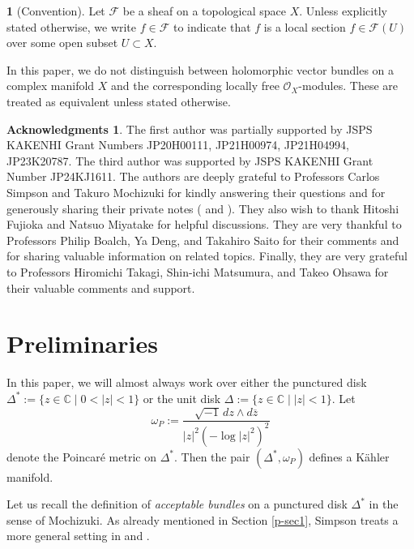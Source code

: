 \documentclass[12pt,twoside]{amsart}
\theoremstyle{definition}
\newtheorem*{ack}{Acknowledgments}
\newtheorem{say}[thm]{}
\begin{document}
\begin{say}[Convention]\label{p-say1.15}
Let $\mathcal{F}$ be a sheaf on a topological space $X$.  
Unless explicitly stated otherwise, we write  
$f \in \mathcal{F}$ to indicate that $f$ is a local section  
$f \in \mathcal{F}(U)$ over some open subset $U \subset X$.  

In this paper, we do not distinguish between holomorphic vector bundles  
on a complex manifold $X$ and the corresponding locally free  
$\mathcal{O}_X$-modules. These are treated as equivalent  
unless stated otherwise.
\end{say}

\begin{ack}\label{p-ack}
The first author was partially 
supported by JSPS KAKENHI Grant Numbers 
JP20H00111, JP21H00974, JP21H04994, JP23K20787. 
The third author was supported by 
JSPS KAKENHI Grant Number JP24KJ1611. 
The authors are deeply grateful 
to Professors Carlos Simpson and 
Takuro Mochizuki for kindly 
answering their questions and for generously 
sharing their private notes (\cite{simpson3} and \cite{mochizuki7}). 
They also wish to thank Hitoshi Fujioka 
and Natsuo Miyatake for helpful discussions. 
They are very thankful to Professors Philip Boalch, Ya Deng, and 
Takahiro Saito for their comments and for sharing valuable information 
on related topics.  
Finally, they are very grateful to Professors 
Hiromichi Takagi, Shin-ichi Matsumura, and 
Takeo Ohsawa for their valuable comments and support.
\end{ack}

\section{Preliminaries}\label{p-sec2}

In this paper, we will almost always 
work over either the punctured disk 
$\Delta^* := \{ z \in \mathbb{C} \mid 0 < |z| < 1 \}$ 
or the unit disk $\Delta := \{ z \in \mathbb{C} \mid |z| < 1 \}$.
Let 
\[
\omega_P := \frac{\sqrt{-1}\,dz \wedge d\overline{z}}{|z|^2 (-\log|z|^2)^2}
\] 
denote the Poincar\'e metric on $\Delta^*$.
Then the pair $(\Delta^*, \omega_P)$ defines a K\"ahler manifold.

Let us recall the definition of {\em{acceptable bundles}} 
on a punctured disk $\Delta^*$ in the sense of Mochizuki. 
As already mentioned in Section \ref{p-sec1}, Simpson treats a more general setting 
in \cite{simpson1} and \cite{simpson2}. 
\end{document}
